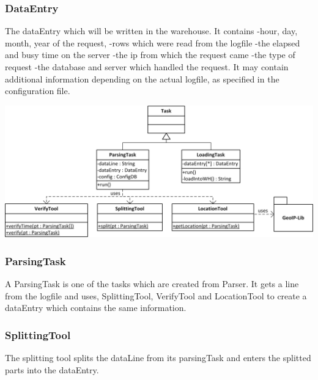 \subsubsection*{DataEntry}
The dataEntry which will be written in the warehouse.
It contains 
-hour, day, month, year of the request,
-rows which were read  from the logfile%
-the elapsed and busy time on the server
-the ip from which the request came
-the type of request
-the database and server which handled the request. %
It may contain additional information depending on the actual logfile, as specified in the configuration file. %


\begin{center}
\includegraphics[width=1\linewidth]{Pictures/Parts/TaskTool.png}
\end{center}  

\subsubsection*{ParsingTask}
A ParsingTask is one of the tasks which are created from Parser. It gets a line from the logfile and uses, SplittingTool, VerifyTool
and LocationTool to create a dataEntry which contains the same information. 


\subsubsection*{SplittingTool}
The splitting tool splits the dataLine from its parsingTask and enters the splitted parts into the dataEntry.

